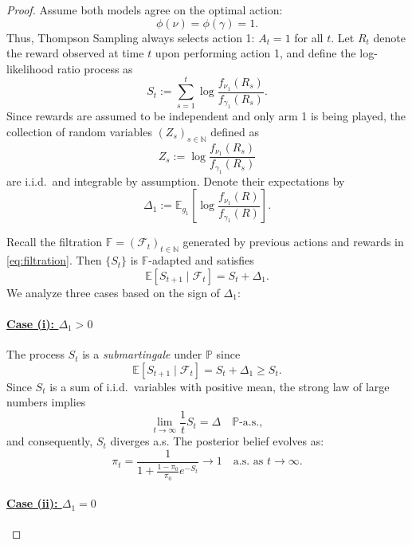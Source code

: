 \documentclass[12pt]{article}
\begin{document}
\begin{proof}
Assume both models agree on the optimal action:
\[
\phi(\nu) = \phi(\gamma) = 1.
\]
Thus, Thompson Sampling always selects action 1: \( A_t = 1 \) for all \( t \). 
Let \( R_t \) denote the reward observed at time \( t \) upon performing action 1, and define the log-likelihood ratio process as
\[
S_t := \sum_{s=1}^t \log \frac{f_{\nu_1}(R_s)}{f_{\gamma_1}(R_s)}.
\]
Since rewards are assumed to be independent and only arm 1 is being played, the collection of random variables $(Z_s)_{s \in \mathbb N}$ defined as
\[
Z_s := \log \frac{f_{\nu_1}(R_s)}{f_{\gamma_1}(R_s)}
\]
are i.i.d.~and integrable by assumption.
Denote their expectations by
\[
\Delta_1 := \mathbb{E}_{g_1} \left[ \log \frac{f_{\nu_1}(R)}{f_{\gamma_1}(R)} \right].
\]

Recall the filtration $\mathbb F = (\mathcal F_t)_{t \in \mathbb N}$ generated by previous actions and rewards in \eqref{eq:filtration}.
Then \( \{S_t\} \) is $\mathbb F$-adapted and satisfies
\[
\mathbb{E}[S_{t+1} \mid \mathcal{F}_t] = S_t + \Delta_1.
\]
We analyze three cases based on the sign of \( \Delta_1 \):

\paragraph{\underline{Case (i): $\Delta_1 > 0$}}

The process \( S_t \) is a \emph{submartingale} under \( \mathbb{P} \) since
\[
\mathbb{E}[S_{t+1} \mid \mathcal{F}_t] = S_t + \Delta_1 \geq S_t.
\]
Since \( S_t \) is a sum of i.i.d.~variables with positive mean, the strong law of large numbers implies
\[
\lim_{t \to \infty} \frac 1 t S_t = \Delta \quad \text{$\mathbb P$-a.s.},
\]
and consequently, $S_t$ diverges a.s.
The posterior belief evolves as:
\[
\pi_t = \frac{1}{1 + \frac{1 - \pi_0}{\pi_0} e^{-S_t}} \to 1 \quad \text{a.s. as $t \to \infty$.}
\]

\paragraph{\underline{Case (ii): $\Delta_1 = 0$}}


\end{proof}
\end{document}
